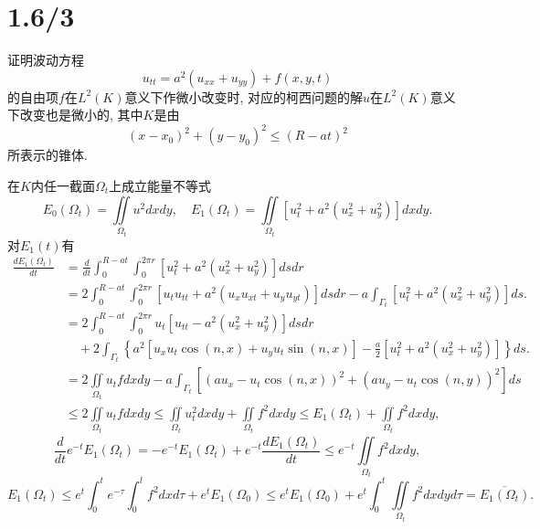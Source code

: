 \documentclass[11pt,a4paper]{article}
\author{刘逸灏 (515370910207)}
\begin{document}
\maketitle

\section{1.6/3}
\begin{problem}
证明波动方程
$$u_{tt}=a^2(u_{xx}+u_{yy})+f(x,y,t)$$
的自由项$f$在$L^2(K)$意义下作微小改变时, 对应的柯西问题的解$u$在$L^2(K)$意义下改变也是微小的, 其中$K$是由
$$(x-x_0)^2+(y-y_0)^2\leqslant(R-at)^2$$
所表示的锥体.
\end{problem}
在$K$内任一截面$\Omega_t$上成立能量不等式
$$E_0(\Omega_t)=\iint\limits_{\Omega_t}u^2dxdy,\quad E_1(\Omega_t)=\iint\limits_{\Omega_t}\left[u_t^2+a^2\left(u_x^2+u_y^2\right)\right]dxdy.$$
对$E_1(t)$有
\begin{align*}
  \frac{dE_1(\Omega_t)}{dt}
   & =\frac{d}{dt}\int_0^{R-at}\int_0^{2\pi r}\left[u_t^2+a^2\left(u_x^2+u_y^2\right)\right]dsdr                                        \\
   & =2\int_0^{R-at}\int_0^{2\pi r}\left[u_tu_{tt}+a^2\left(u_xu_{xt}+u_yu_{yt}\right)\right]dsdr-
  a\int_{\Gamma_t}\left[u_t^2+a^2\left(u_x^2+u_y^2\right)\right]ds.                                                                     \\
   & =2\int_0^{R-at}\int_0^{2\pi r}u_t\left[u_{tt}-a^2\left(u_x^2+u_y^2\right)\right]dsdr                                               \\
   & \quad+2\int_{\Gamma_t}\left\{a^2[u_xu_t\cos(n,x)+u_yu_t\sin(n,x)]-
  \frac{a}{2}\left[u_t^2+a^2\left(u_x^2+u_y^2\right)\right]\right\}ds.                                                                  \\
   & =2\iint\limits_{\Omega_t}u_tfdxdy-a\int_{\Gamma_t}\left[\left(au_x-u_t\cos(n,x)\right)^2+\left(au_y-u_t\cos(n,y)\right)^2\right]ds \\
   & \leqslant 2\iint\limits_{\Omega_t}u_tfdxdy\leqslant \iint\limits_{\Omega_t}u_t^2dxdy+\iint\limits_{\Omega_t}f^2dxdy
  \leqslant E_1(\Omega_t)+\iint\limits_{\Omega_t}f^2dxdy,
\end{align*}
$$\frac{d}{dt}e^{-t}E_1(\Omega_t)=-e^{-t}E_1(\Omega_t)+e^{-t}\frac{dE_1(\Omega_t)}{dt}\leqslant e^{-t}\iint\limits_{\Omega_t}f^2dxdy,$$
$$E_1(\Omega_t)\leqslant e^t\int_0^te^{-\tau}\int_0^l f^2dxd\tau+e^tE_1(\Omega_0)\leqslant e^tE_1(\Omega_0)+e^t\int_0^t\iint\limits_{\Omega_t}f^2dxdyd\tau=\overline{E_1(\Omega_t)}.$$
\end{document}
